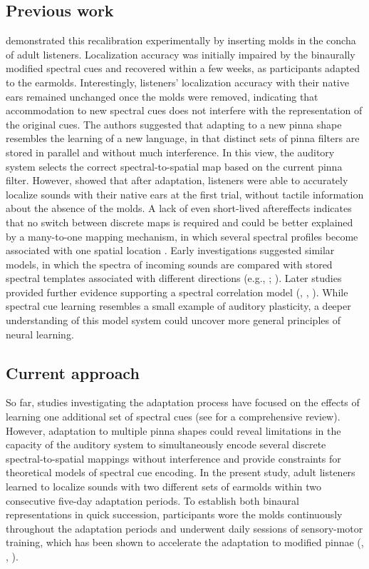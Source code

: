 \documentclass[preprint]{JASA}
\begin{document}
\subsection{Previous work}
\citet{hofman_relearning_1998} demonstrated this recalibration experimentally by inserting molds in the concha of adult listeners. Localization accuracy was initially impaired by the binaurally modified spectral cues and recovered within a few weeks, as participants adapted to the earmolds. Interestingly, listeners' localization accuracy with their native ears remained unchanged once the molds were removed, indicating that accommodation to new spectral cues does not interfere with the representation of the original cues. The authors suggested that adapting to a new pinna shape resembles the learning of a new language, in that distinct sets of pinna filters are stored in parallel and without much interference. In this view, the auditory system selects the correct spectral-to-spatial map based on the current pinna filter. However, \citet{trapeau_fast_2016} showed that after adaptation, listeners were able to accurately localize sounds with their native ears at the first trial, without tactile information about the absence of the molds.  A lack of even short-lived aftereffects indicates that no switch between discrete maps is required and could be better explained by a many-to-one mapping mechanism, in which several spectral profiles become associated with one spatial location \citep{trapeau_fast_2016}. Early investigations suggested similar models, in which the spectra of incoming sounds are compared with stored spectral templates associated with different directions (e.g., \citet{blauert_sound_1969}; \citet{hebrank_spectral_1974}). Later studies provided further evidence supporting a spectral correlation model (\citet{middlebrooks_narrow-band_1992}, \citet{langendijk_contribution_2002}, \citet{baumgartner_modeling_2014}). While spectral cue learning resembles a small example of auditory plasticity, a deeper understanding of this model system could uncover more general principles of neural learning. 

\subsection{Current approach}
So far, studies investigating the adaptation process have focused on the effects of learning one additional set of spectral cues (see \citet{carlile_plastic_2014} for a comprehensive review). However, adaptation to multiple pinna shapes could reveal limitations in the capacity of the auditory system to simultaneously encode several discrete spectral-to-spatial mappings without interference and provide constraints for theoretical models of spectral cue encoding. In the present study, adult listeners learned to localize sounds with two different sets of earmolds within two consecutive five-day adaptation periods. To establish both binaural representations in quick succession, participants wore the molds continuously throughout the adaptation periods and underwent daily sessions of sensory-motor training, which has been shown to accelerate the adaptation to modified pinnae (\citet{carlile_relearning_2014}, \citet{parseihian_rapid_2012}, \citet{trapeau_fast_2016}). 
\end{document}
